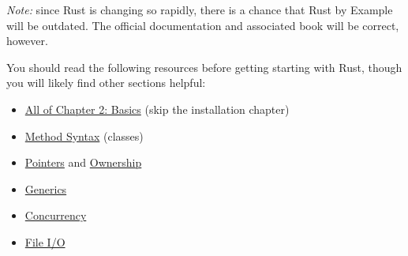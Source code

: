 \emph{Note:} since Rust is changing so rapidly, there is a chance that
Rust by Example will be outdated. The official documentation and
associated book will be correct, however.

You should read the following resources before getting starting with
Rust, though you will likely find other sections helpful:

\begin{itemize}
\itemsep1pt\parskip0pt
\item
  \href{http://doc.rust-lang.org/1.0.0-alpha.2/book/basic.html}{All of
  Chapter 2: Basics} (skip the installation chapter)
\item
  \href{http://doc.rust-lang.org/1.0.0-alpha.2/book/method-syntax.html}{Method
  Syntax} (classes)
\item
  \href{http://doc.rust-lang.org/1.0.0-alpha.2/book/pointers.html}{Pointers}
  and
  \href{http://doc.rust-lang.org/1.0.0-alpha.2/book/ownership.html}{Ownership}
\item
  \href{http://doc.rust-lang.org/1.0.0-alpha.2/book/generics.html}{Generics}
\item
  \href{http://doc.rust-lang.org/1.0.0-alpha.2/book/concurrency.html}{Concurrency}
\item
  \href{http://rustbyexample.com/file.html}{File I/O}
\end{itemize}
